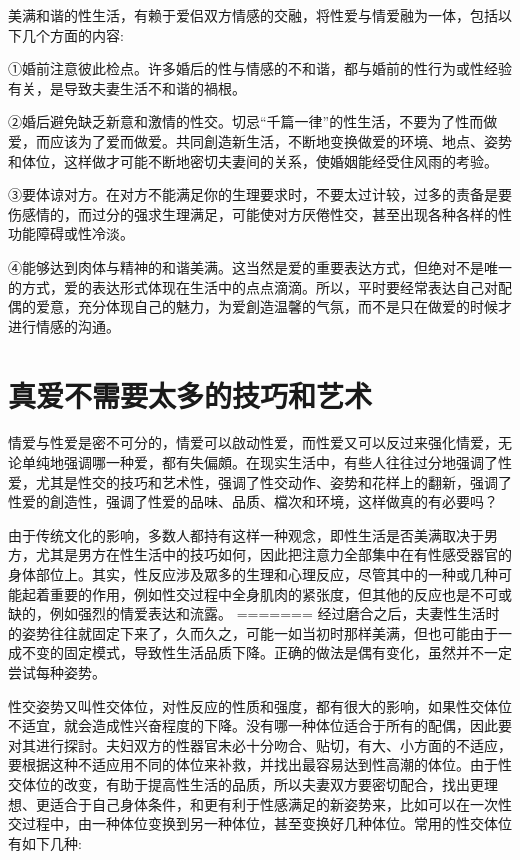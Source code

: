 \documentclass[12pt,UTF8]{ctexbook}
\begin{document}
美满和谐的性生活，有赖于爱侣双方情感的交融，将性爱与情爱融为一体，包括以下几个方面的内容:

①婚前注意彼此检点。许多婚后的性与情感的不和谐，都与婚前的性行为或性经验有关，是导致夫妻生活不和谐的禍根。

②婚后避免缺乏新意和激情的性交。切忌“千篇一律”的性生活，不要为了性而做爱，而应该为了爱而做爱。共同創造新生活，不断地变换做爱的环境、地点、姿势和体位，这样做才可能不断地密切夫妻间的关系，使婚姻能经受住风雨的考验。

③要体谅对方。在对方不能满足你的生理要求时，不要太过计较，过多的责备是要伤感情的，而过分的强求生理满足，可能使对方厌倦性交，甚至出现各种各样的性功能障碍或性冷淡。

④能够达到肉体与精神的和谐美满。这当然是爱的重要表达方式，但绝对不是唯一的方式，爱的表达形式体现在生活中的点点滴滴。所以，平时要经常表达自己对配偶的爱意，充分体现自己的魅力，为爱創造温馨的气氛，而不是只在做爱的时候才进行情感的沟通。

\section{真爱不需要太多的技巧和艺术}

情爱与性爱是密不可分的，情爱可以啟动性爱，而性爱又可以反过来强化情爱，无论单纯地强调哪一种爱，都有失偏頗。在现实生活中，有些人往往过分地强调了性爱，尤其是性交的技巧和艺术性，强调了性交动作、姿势和花样上的翻新，强调了性爱的創造性，强调了性爱的品味、品质、檔次和环境，这样做真的有必要吗？

由于传统文化的影响，多数人都持有这样一种观念，即性生活是否美满取决于男方，尤其是男方在性生活中的技巧如何，因此把注意力全部集中在有性感受器官的身体部位上。其实，性反应涉及眾多的生理和心理反应，尽管其中的一种或几种可能起着重要的作用，例如性交过程中全身肌肉的紧张度，但其他的反应也是不可或缺的，例如强烈的情爱表达和流露。
=======
经过磨合之后，夫妻性生活时的姿势往往就固定下来了，久而久之，可能一如当初时那样美满，但也可能由于一成不变的固定模式，导致性生活品质下降。正确的做法是偶有变化，虽然并不一定尝试每种姿势。

性交姿势又叫性交体位，对性反应的性质和强度，都有很大的影响，如果性交体位不适宜，就会造成性兴奋程度的下降。没有哪一种体位适合于所有的配偶，因此要对其进行探討。夫妇双方的性器官未必十分吻合、贴切，有大、小方面的不适应，要根据这种不适应用不同的体位来补救，并找出最容易达到性高潮的体位。由于性交体位的改变，有助于提高性生活的品质，所以夫妻双方要密切配合，找出更理想、更适合于自己身体条件，和更有利于性感满足的新姿势来，比如可以在一次性交过程中，由一种体位变换到另一种体位，甚至变换好几种体位。常用的性交体位有如下几种:
\end{document}
